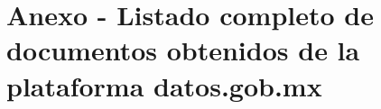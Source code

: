 \chapter{Anexo - Listado completo de documentos obtenidos de la plataforma datos.gob.mx}
\label{DocList}
